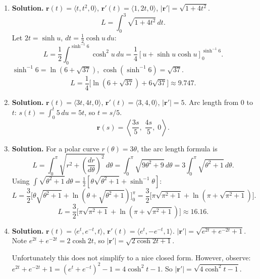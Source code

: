 \begin{enumerate}
More precisely: if $\kappa>0$ is constant and $\tau=0$, the curve is a circle of radius $1/\kappa$. If both $\kappa>0$ and $\tau\neq 0$ are constant, the curve is a circular helix. The radius of the helix is $r=\kappa/(\kappa^2+\tau^2)$ and the pitch (rise per turn) is
$2\pi|\tau|/(\kappa^2+\tau^2)$.

This is a classical result: 


\item \textbf{Solution.}
$\mathbf{r}(t)=\langle t, t^2, 0\rangle$, $\mathbf{r}'(t)=\langle 1,2t,0\rangle$, $|\mathbf{r}'|=\sqrt{1+4t^2}$.
\[
L=\int_0^3\sqrt{1+4t^2}\,dt.
\]
Let $2t=\sinh u$, $dt=\frac{1}{2}\cosh u\,du$:
\[
L = \frac{1}{2}\int_0^{\sinh^{-1}6}\cosh^2 u\,du = \frac{1}{4}[u+\sinh u\cosh u]_0^{\sinh^{-1}6}.
\]
$\sinh^{-1}6=\ln(6+\sqrt{37})$, $\cosh(\sinh^{-1}6)=\sqrt{37}$.
\[
\boxed{L=\frac{1}{4}\bigl[\ln(6+\sqrt{37})+6\sqrt{37}\bigr]\approx 9.747.}
\]

\item \textbf{Solution.}
$\mathbf{r}(t)=\langle 3t, 4t, 0\rangle$, $\mathbf{r}'(t)=\langle 3,4,0\rangle$, $|\mathbf{r}'|=5$.
Arc length from $0$ to $t$: $s(t)=\int_0^t 5\,du = 5t$, so $t=s/5$.
\[
\boxed{\mathbf{r}(s)=\left\langle \frac{3s}{5},\; \frac{4s}{5},\; 0\right\rangle.}
\]

\item \textbf{Solution.}
For a polar curve $r(\theta)=3\theta$, the arc length formula is
\[
L=\int_0^{\pi}\sqrt{r^2+\left(\frac{dr}{d\theta}\right)^2}\,d\theta = \int_0^{\pi}\sqrt{9\theta^2+9}\,d\theta = 3\int_0^{\pi}\sqrt{\theta^2+1}\,d\theta.
\]
Using $\int\sqrt{\theta^2+1}\,d\theta = \frac{1}{2}[\theta\sqrt{\theta^2+1}+\sinh^{-1}\theta]$:
\[
L = \frac{3}{2}\bigl[\theta\sqrt{\theta^2+1}+\ln(\theta+\sqrt{\theta^2+1})\bigr]_0^{\pi} = \frac{3}{2}\bigl[\pi\sqrt{\pi^2+1}+\ln(\pi+\sqrt{\pi^2+1})\bigr].
\]
\[
\boxed{L = \frac{3}{2}\bigl[\pi\sqrt{\pi^2+1}+\ln(\pi+\sqrt{\pi^2+1})\bigr]\approx 16.16.}
\]

\item \textbf{Solution.}
$\mathbf{r}(t)=\langle e^t, e^{-t}, t\rangle$, $\mathbf{r}'(t)=\langle e^t, -e^{-t}, 1\rangle$.
$|\mathbf{r}'|=\sqrt{e^{2t}+e^{-2t}+1}$.
Note $e^{2t}+e^{-2t}=2\cosh 2t$, so $|\mathbf{r}'|=\sqrt{2\cosh 2t+1}$.

Unfortunately this does not simplify to a nice closed form. However, observe:
$e^{2t}+e^{-2t}+1=(e^t+e^{-t})^2-1 = 4\cosh^2 t -1$. So $|\mathbf{r}'|=\sqrt{4\cosh^2 t-1}$.


\end{enumerate}
